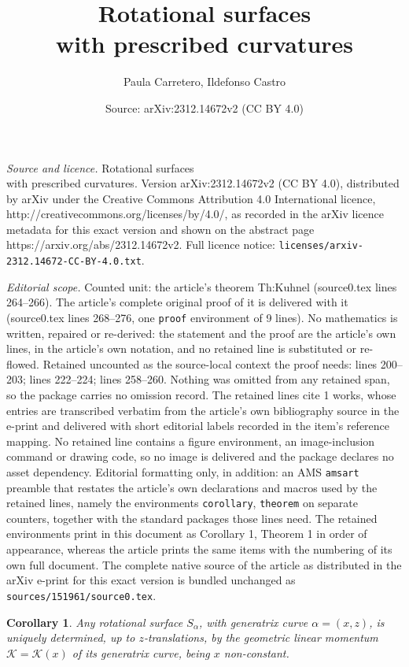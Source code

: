 \documentclass[10pt,a4paper]{amsart}
\title{Rotational surfaces \\ with prescribed curvatures}
\author{Paula Carretero, Ildefonso Castro}
\date{Source: arXiv:2312.14672v2 (CC BY 4.0)}
\newtheorem{corollary}{Corollary}
\begin{document}
\maketitle

\noindent\emph{Source and licence.} Rotational surfaces \\ with prescribed curvatures. Version arXiv:2312.14672v2 (CC BY 4.0), distributed by arXiv under the Creative Commons Attribution 4.0 International licence, http://creativecommons.org/licenses/by/4.0/, as recorded in the arXiv licence metadata for this exact version and shown on the abstract page https://arxiv.org/abs/2312.14672v2. Full licence notice: \texttt{licenses/arxiv-2312.14672-CC-BY-4.0.txt}.\par\smallskip

\noindent\textit{Editorial scope.} Counted unit: the article's theorem Th:Kuhnel (source0.tex lines 264--266). The article's complete original proof of it is delivered with it (source0.tex lines 268--276, one \texttt{proof} environment of 9 lines). No mathematics is written, repaired or re-derived: the statement and the proof are the article's own lines, in the article's own notation, and no retained line is substituted or re-flowed.  Retained uncounted as the source-local context the proof needs: lines 200--203; lines 222--224; lines 258--260.  Nothing was omitted from any retained span, so the package carries no omission record.  The retained lines cite 1 works, whose entries are transcribed verbatim from the article's own bibliography source in the e-print and delivered with short editorial labels recorded in the item's reference mapping.  No retained line contains a figure environment, an image-inclusion command or drawing code, so no image is delivered and the package declares no asset dependency.  Editorial formatting only, in addition: an AMS \texttt{amsart} preamble that restates the article's own declarations and macros used by the retained lines, namely the environments \texttt{corollary}, \texttt{theorem} on separate counters, together with the standard packages those lines need.  The retained environments print in this document as Corollary 1, Theorem 1 in order of appearance, whereas the article prints the same items with the numbering of its own full document.  The complete native source of the article as distributed in the arXiv e-print for this exact version is bundled unchanged as \texttt{sources/151961/source0.tex}.
\begin{corollary}\cite[Corollary 2]{CC22}
	\label{cor:keysurfaces}
	Any rotational surface $S_\alpha$, with generatrix curve $\alpha = (x,z)$, is uniquely determined, up to $z$-translations, by the geometric linear momentum $\mathcal K=\mathcal K (x)$ of its generatrix curve, being $x$ non-constant. 
\end{corollary}
\end{document}
